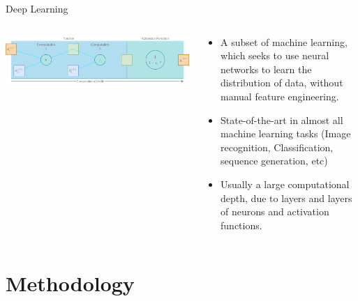\documentclass[aspectratio=169]{beamer}
\begin{document}
    \begin{frame}{Deep Learning}
      \begin{columns}
        \begin{column}{0.5\textwidth}
          \includegraphics[width=1\linewidth]{neuron.png}
        \end{column}
        \begin{column}{0.5\textwidth}
          \begin{itemize}
            \item A subset of machine learning, which seeks to use neural networks to learn the distribution of data, without manual feature engineering.
            \item State-of-the-art in almost all machine learning tasks (Image recognition, Classification, sequence generation, etc)
            \item Usually a large computational depth, due to layers and layers of neurons and activation functions.
          \end{itemize}
        \end{column}
      \end{columns}
    \end{frame}

  \section{Methodology}
\end{document}
